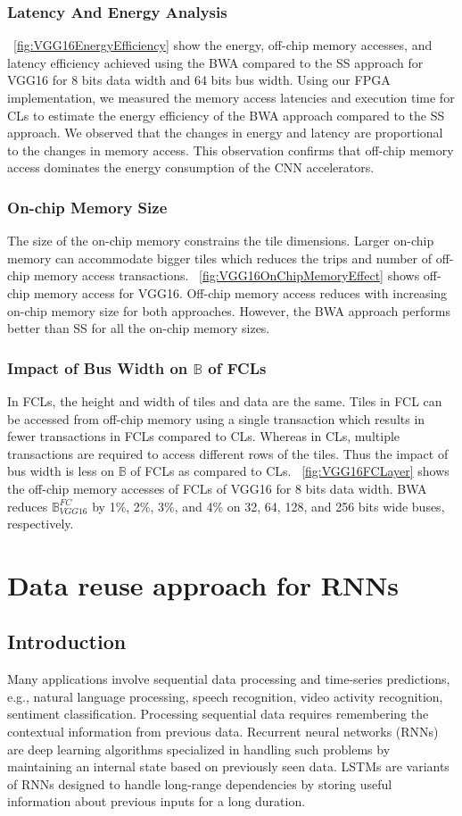 \documentclass[a4paper,10pt]{article}
\newcommand{\numBytesOffChip}{\mathbb{B}}
\begin{document}
\subsubsection{Latency And Energy Analysis}
\figurename{~\ref{fig:VGG16EnergyEfficiency}} show the energy, off-chip memory accesses, and latency efficiency achieved using the BWA compared to the SS approach for VGG16 for 8 bits data width and 64 bits bus width. Using our FPGA implementation, we measured the memory access latencies and execution time for CLs to estimate the energy efficiency of the BWA approach compared to the SS approach. We observed that the changes in energy and latency are proportional to the changes in memory access. This observation confirms that off-chip memory access dominates the energy consumption of the CNN accelerators.
\subsubsection{On-chip Memory Size}
The size of the on-chip memory constrains the tile dimensions. Larger on-chip memory can accommodate bigger tiles which reduces the trips and number of off-chip memory access transactions. \figurename{~\ref{fig:VGG16OnChipMemoryEffect}} shows off-chip memory access for VGG16. Off-chip memory access reduces with increasing on-chip memory size for both approaches. However, the BWA approach performs better than SS for all the on-chip memory sizes.
\subsubsection{Impact of Bus Width on $\numBytesOffChip$ of FCLs}
In FCLs, the height and width of tiles and data are the same. Tiles in FCL can be accessed from off-chip memory using a single transaction which results in fewer transactions in FCLs compared to CLs. Whereas in CLs, multiple transactions are required to access different rows of the tiles. Thus the impact of bus width is less on $\numBytesOffChip$ of FCLs as compared to CLs. \figurename~\ref{fig:VGG16FCLayer} shows the off-chip memory accesses of FCLs of VGG16 for 8 bits data width. BWA reduces $\numBytesOffChip_{VGG16}^{FC}$ by 1\%, 2\%, 3\%, and 4\% on 32, 64, 128, and 256 bits wide buses, respectively. 
\section{Data reuse approach for RNNs}
\subsection{Introduction}
Many applications involve sequential data processing and time-series predictions, e.g., natural language processing, speech recognition, video activity recognition, sentiment classification. Processing sequential data requires remembering the contextual information from previous data. Recurrent neural networks (RNNs) are deep learning algorithms specialized in handling such problems by maintaining an internal state based on previously seen data. LSTMs \cite{hochreiter1997long} are variants of RNNs designed to handle long-range dependencies by storing useful information about previous inputs for a long duration. 
\end{document}
